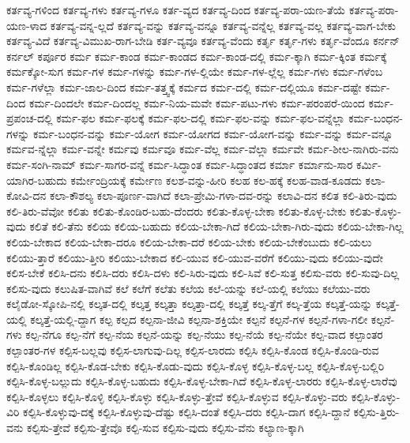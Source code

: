 {ಕರ್ತವ್ಯ-ಗಳಿಂದ
ಕರ್ತವ್ಯ-ಗಳು
ಕರ್ತವ್ಯ-ಗಳೂ
ಕರ್ತ-ವ್ಯದ
ಕರ್ತವ್ಯ-ದಿಂದ
ಕರ್ತವ್ಯ-ಪರಾ-ಯಣ-ತೆಯೆ
ಕರ್ತವ್ಯ-ಪರಾ-ಯಣ-ಳಾದ
ಕರ್ತವ್ಯ-ವನ್ನ-ಲ್ಲದೆ
ಕರ್ತವ್ಯ-ವನ್ನು
ಕರ್ತವ್ಯ-ವನ್ನೂ
ಕರ್ತವ್ಯ-ವನ್ನೆಲ್ಲ
ಕರ್ತವ್ಯ-ವಲ್ಲ
ಕರ್ತವ್ಯ-ವಾಗ-ಬೇಕು
ಕರ್ತವ್ಯ-ವಿದೆ
ಕರ್ತವ್ಯ-ವಿಮುಖ-ರಾಗ-ಬೇಡಿ
ಕರ್ತ-ವ್ಯವೂ
ಕರ್ತವ್ಯ-ವೆಂದು
ಕರ್ತೃ
ಕರ್ತೃ-ಗಳು
ಕರ್ತೃ-ವೆಂದೂ
ಕರ್ನನ್
ಕರ್ನಲ್
ಕರ್ಪೂರ
ಕರ್ಮ
ಕರ್ಮ-ಕಾಂಡ
ಕರ್ಮ-ಕಾಂಡದ
ಕರ್ಮ-ಕಾಂಡ-ದಲ್ಲಿ
ಕರ್ಮ-ಕ್ಕಾಗಿ
ಕರ್ಮ-ಕ್ಕಿಂತ
ಕರ್ಮಕ್ಕೆ
ಕರ್ಮಕ್ಕೋ-ಸುಗ
ಕರ್ಮ-ಗಳ
ಕರ್ಮ-ಗಳನ್ನು
ಕರ್ಮ-ಗಳ-ಲ್ಲಿಯೇ
ಕರ್ಮ-ಗಳ-ಲ್ಲೆಲ್ಲ
ಕರ್ಮ-ಗಳು
ಕರ್ಮ-ಗಳೆಂಬ
ಕರ್ಮ-ಗಳೆಲ್ಲಾ
ಕರ್ಮ-ಜಾಲ-ದಿಂದ
ಕರ್ಮ-ತತ್ತ್ವಕ್ಕೆ
ಕರ್ಮದ
ಕರ್ಮ-ದಲ್ಲಿ
ಕರ್ಮ-ದಲ್ಲಿಯೂ
ಕರ್ಮ-ದಷ್ಟೇ
ಕರ್ಮ-ದಿಂದ
ಕರ್ಮ-ದಿಂದಲೇ
ಕರ್ಮ-ದಿಂದಲ್ಲ
ಕರ್ಮ-ನಿಯ-ಮವೇ
ಕರ್ಮ-ಪಟು-ಗಳು
ಕರ್ಮ-ಪರಂಪರೆ-ಯಿಂದ
ಕರ್ಮ-ಪ್ರಪಂಚ-ದಲ್ಲಿ
ಕರ್ಮ-ಫಲ
ಕರ್ಮ-ಫಲಕ್ಕೆ
ಕರ್ಮ-ಫಲ-ದಲ್ಲಿ
ಕರ್ಮ-ಫಲ-ವನ್ನು
ಕರ್ಮ-ಫಲ-ವನ್ನೆಲ್ಲಾ
ಕರ್ಮ-ಬಂಧನ-ಗಳನ್ನು
ಕರ್ಮ-ಬಂಧನ-ವನ್ನು
ಕರ್ಮ-ಯೋಗ
ಕರ್ಮ-ಯೋಗದ
ಕರ್ಮ-ಯೋಗ-ವನ್ನು
ಕರ್ಮ-ವನ್ನು
ಕರ್ಮ-ವನ್ನೂ
ಕರ್ಮವ-ನ್ನೆಲ್ಲಾ
ಕರ್ಮ-ವನ್ನೇ
ಕರ್ಮವು
ಕರ್ಮವೂ
ಕರ್ಮ-ವೆಲ್ಲ
ಕರ್ಮ-ವೆಲ್ಲಾ
ಕರ್ಮವೇ
ಕರ್ಮ-ಶೀಲ-ನಾಗಿರು-ವನು
ಕರ್ಮ-ಸಂಗಿ-ನಾಮ್
ಕರ್ಮ-ಸಾಗರ-ವನ್ನೆ
ಕರ್ಮ-ಸಿದ್ಧಾಂತ
ಕರ್ಮ-ಸಿದ್ಧಾಂತದ
ಕರ್ಮಾ
ಕರ್ಮಾನು-ಸಾರ
ಕರ್ಮಿ-ಯಾಗಿರ-ಬಹುದು
ಕರ್ಮೇಂದ್ರಿಯಕ್ಕೆ
ಕರ್ಮೇಣ
ಕಲಶ-ವನ್ನು-ಹೀರಿ
ಕಲಹ
ಕಲ-ಹಕ್ಕೆ
ಕಲಹ-ವಾಡ-ಕೂಡದು
ಕಲಾ-ಕೋವಿ-ದನ
ಕಲಾ-ಕೌಶಲ್ಯ
ಕಲಾ-ಪೂರ್ಣ-ವಾಗಿದೆ
ಕಲಾ-ಪ್ರೇಮಿ-ಗಳಾ-ದವ-ರನ್ನು
ಕಲಾವಿ-ದನ
ಕಲಿತ
ಕಲಿ-ತಿರು-ವುದು
ಕಲಿ-ತಿರು-ವೆವೋ
ಕಲಿತು
ಕಲಿತು-ಕೊಂಡಿರ-ಬಹು-ದೆಂದರು
ಕಲಿತು-ಕೊಳ್ಳ-ಬೇಕಾ
ಕಲಿತು-ಕೊಳ್ಳ-ಬೇಕು
ಕಲಿತು-ಕೊಳ್ಳು-ವುದು
ಕಲಿತೆ
ಕಲಿ-ತೆನು
ಕಲಿಯ
ಕಲಿಯ-ಬಹುದು
ಕಲಿಯ-ಬೇಕಾ-ಗಿದೆ
ಕಲಿಯ-ಬೇಕಾ-ಗಿರು-ವುದು
ಕಲಿಯ-ಬೇಕಾ-ಗಿಲ್ಲ
ಕಲಿಯ-ಬೇಕಾದ
ಕಲಿಯ-ಬೇಕಾ-ದರೂ
ಕಲಿಯ-ಬೇಕಾ-ದರೆ
ಕಲಿಯ-ಬೇಕು
ಕಲಿಯ-ಬೇಕೆಂಬುದು
ಕಲಿ-ಯಲು
ಕಲಿಯು-ತ್ತಾರೆ
ಕಲಿಯು-ತ್ತೀರಿ
ಕಲಿಯು-ಬೇಕಾದ
ಕಲಿ-ಯುವ
ಕಲಿ-ಯುವ-ವರೆಗೆ
ಕಲಿಯು-ವುದು
ಕಲಿಯು-ವುದೇ
ಕಲಿಸ-ಬೇಕೆ
ಕಲಿಸಿ-ದನು
ಕಲಿಸಿ-ದರು
ಕಲಿಸಿ-ದಳು
ಕಲಿ-ಸಿರು-ವುದು
ಕಲಿ-ಸಿವೆ
ಕಲಿ-ಸುತ್ತ
ಕಲಿಸು-ವರು
ಕಲಿ-ಸುವು-ದಿಲ್ಲ
ಕಲಿಸು-ವುದು
ಕಲುಷಿತ-ವಾಗಿವೆ
ಕಲೆ
ಕಲೆಗೆ
ಕಲೆತು
ಕಲೆಯ
ಕಲೆ-ಯನ್ನು
ಕಲೆ-ಯಲ್ಲಿ
ಕಲೆಯು
ಕಲೆಯು-ವರು
ಕಲೈಡೋ-ಸ್ಕೋಪಿ-ನಲ್ಲಿ
ಕಲ್ಕತ-ದಲ್ಲಿ
ಕಲ್ಕತ್ತ
ಕಲ್ಕತ್ತಾ
ಕಲ್ಕತ್ತಾ-ದಲ್ಲಿ
ಕಲ್ಕತ್ತೆ
ಕಲ್ಕ-ತ್ತೆಗೆ
ಕಲ್ಕ-ತ್ತೆಯ
ಕಲ್ಕತ್ತೆ-ಯನ್ನು
ಕಲ್ಕತ್ತೆ-ಯಲ್ಲಿ
ಕಲ್ಕತ್ತೆ-ಯಲ್ಲಿ-ದ್ದಾಗ
ಕಲ್ಪ
ಕಲ್ಪದ
ಕಲ್ಪನಾ-ಜೀವಿ
ಕಲ್ಪನಾ-ಶಕ್ತಿಯೇ
ಕಲ್ಪನೆ
ಕಲ್ಪನೆ-ಗಳ
ಕಲ್ಪನೆ-ಗಳಾ-ಗಲೀ
ಕಲ್ಪನೆ-ಗಳು
ಕಲ್ಪ-ನೆಗೂ
ಕಲ್ಪ-ನೆಗೆ
ಕಲ್ಪ-ನೆಯ
ಕಲ್ಪನೆ-ಯನ್ನು
ಕಲ್ಪ-ನೆಯು
ಕಲ್ಪ-ನೆಯೆ
ಕಲ್ಪ-ನೆಯೇ
ಕಲ್ಪ-ವಾದ
ಕಲ್ಪಾಂತರ
ಕಲ್ಪಾಂತರ-ಗಳ
ಕಲ್ಪಿಸ-ಬಲ್ಲವು
ಕಲ್ಪಿಸ-ಲಾಗುವು-ದಿಲ್ಲ
ಕಲ್ಪಿಸ-ಲಾರದು
ಕಲ್ಪಿಸಿ
ಕಲ್ಪಿಸಿ-ಕೊಂಡ
ಕಲ್ಪಿಸಿ-ಕೊಂಡಿ-ರುವ
ಕಲ್ಪಿಸಿ-ಕೊಂಡಿಲ್ಲ
ಕಲ್ಪಿಸಿ-ಕೊಡ-ಬೇಕು
ಕಲ್ಪಿಸಿ-ಕೊಡು-ವುದು
ಕಲ್ಪಿಸಿ-ಕೊಳ್ಳ
ಕಲ್ಪಿಸಿ-ಕೊಳ್ಳ-ಬಲ್ಲ
ಕಲ್ಪಿಸಿ-ಕೊಳ್ಳ-ಬಲ್ಲಿರಿ
ಕಲ್ಪಿಸಿ-ಕೊಳ್ಳ-ಬಲ್ಲುದು
ಕಲ್ಪಿಸಿ-ಕೊಳ್ಳ-ಬಹುದು
ಕಲ್ಪಿಸಿ-ಕೊಳ್ಳ-ಬೇಕಾ-ಗಿದೆ
ಕಲ್ಪಿಸಿ-ಕೊಳ್ಳ-ಲಾರರು
ಕಲ್ಪಿಸಿ-ಕೊಳ್ಳ-ಲಾರೆವು
ಕಲ್ಪಿಸಿ-ಕೊಳ್ಳಲು
ಕಲ್ಪಿಸಿ-ಕೊಳ್ಳಿ
ಕಲ್ಪಿಸಿ-ಕೊಳ್ಳು
ಕಲ್ಪಿಸಿ-ಕೊಳ್ಳು-ತ್ತೇವೆ
ಕಲ್ಪಿಸಿ-ಕೊಳ್ಳುವ
ಕಲ್ಪಿಸಿ-ಕೊಳ್ಳು-ವರು
ಕಲ್ಪಿಸಿ-ಕೊಳ್ಳು-ವಿರಿ
ಕಲ್ಪಿಸಿ-ಕೊಳ್ಳುವು-ದಕ್ಕೆ
ಕಲ್ಪಿಸಿ-ಕೊಳ್ಳುವು-ದೆಷ್ಟು
ಕಲ್ಪಿಸಿ-ದಂತೆ
ಕಲ್ಪಿಸಿ-ದರು
ಕಲ್ಪಿಸಿ-ದಾಗ
ಕಲ್ಪಿಸಿ-ದ್ದಾನೆ
ಕಲ್ಪಿಸು-ತ್ತಿರು-ವನು
ಕಲ್ಪಿಸು-ತ್ತೇವೆ
ಕಲ್ಪಿಸು-ತ್ತೇವೊ
ಕಲ್ಪಿ-ಸುವ
ಕಲ್ಪಿಸು-ವುದು
ಕಲ್ಪಿಸು-ವೆನು
ಕಲ್ಯಾಣ-ಕ್ಕಾಗಿ
}
